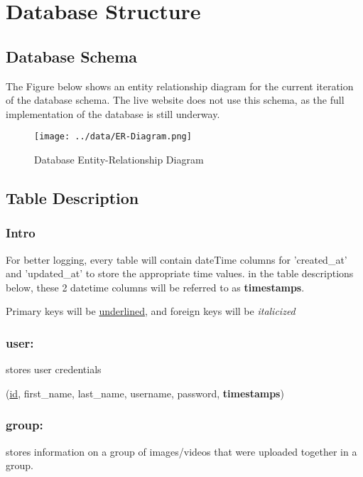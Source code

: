 \documentclass{scrreprt}
\begin{document}
\chapter{Database Structure}

\section{Database Schema}

The Figure below shows an entity relationship diagram for the current iteration
of the database schema. The live website does not use this schema, as the full
implementation of the database is still underway.

\begin{figure}[!ht]
    \caption{Database Entity-Relationship Diagram}
    \label{erDiagram}
	\centering
	\texttt{[image: ../data/ER-Diagram.png]}
\end{figure}

\section{Table Description}

\subsection{Intro}

For better logging, every table will contain dateTime columns for 'created\_at'
and 'updated\_at' to store the appropriate time values. in the table
descriptions below, these 2 datetime columns will be referred to as
\textbf{timestamps}.

Primary keys will be \underline{underlined}, and foreign keys will be
\textit{italicized}

\subsection{user:}

stores user credentials

(\underline{id}, first\_name, last\_name, username, password, \textbf{timestamps})

\subsection{group:}

stores information on a group of images/videos that were uploaded together in a group.
\end{document}
